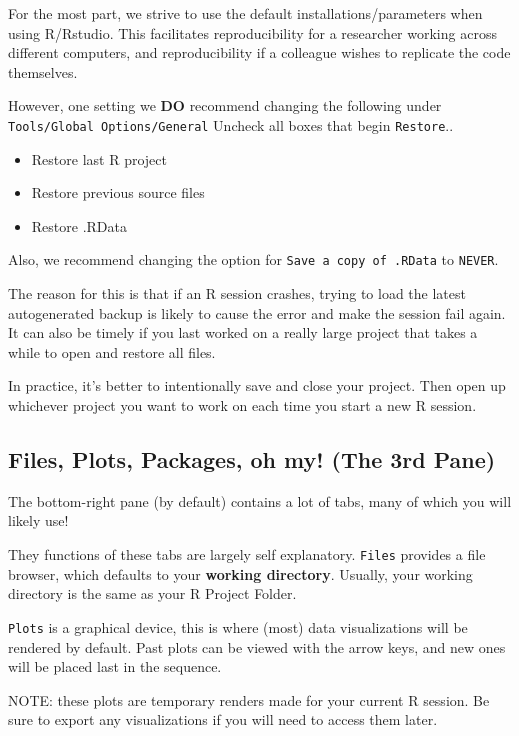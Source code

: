 \documentclass[
]{book}
\begin{document}
For the most part, we strive to use the default installations/parameters when using R/Rstudio. This facilitates reproducibility for a researcher working across different computers, and reproducibility if a colleague wishes to replicate the code themselves.

However, one setting we \textbf{DO} recommend changing the following under \texttt{Tools/Global\ Options/General} Uncheck all boxes that begin \texttt{Restore}..

\begin{itemize}
\item
  Restore last R project
\item
  Restore previous source files
\item
  Restore .RData
\end{itemize}

Also, we recommend changing the option for \texttt{Save\ a\ copy\ of\ .RData} to \texttt{NEVER}.

The reason for this is that if an R session crashes, trying to load the latest autogenerated backup is likely to cause the error and make the session fail again. It can also be timely if you last worked on a really large project that takes a while to open and restore all files.

In practice, it's better to intentionally save and close your project. Then open up whichever project you want to work on each time you start a new R session.

\hypertarget{files-plots-packages-oh-my-the-3rd-pane}{%
\subsection{Files, Plots, Packages, oh my! (The 3rd Pane)}\label{files-plots-packages-oh-my-the-3rd-pane}}

The bottom-right pane (by default) contains a lot of tabs, many of which you will likely use!

They functions of these tabs are largely self explanatory. \texttt{Files} provides a file browser, which defaults to your \textbf{working directory}. Usually, your working directory is the same as your R Project Folder.

\texttt{Plots} is a graphical device, this is where (most) data visualizations will be rendered by default.
Past plots can be viewed with the arrow keys, and new ones will be placed last in the sequence.

NOTE: these plots are temporary renders made for your current R session. Be sure to export any visualizations if you will need to access them later.
\end{document}
